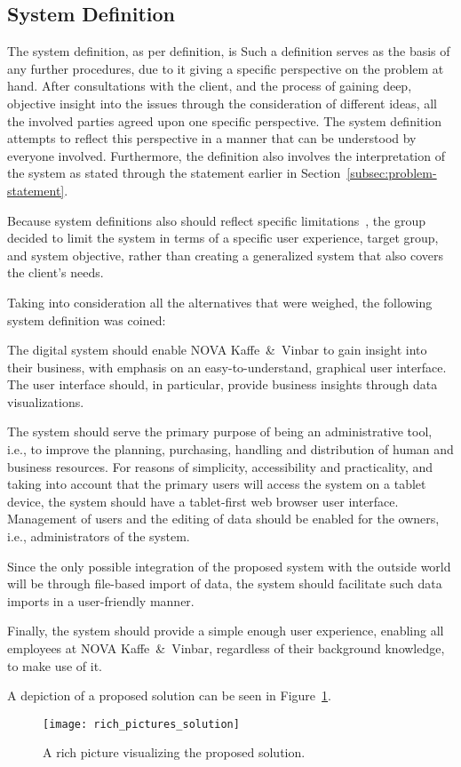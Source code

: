 \subsection{System Definition}\label{subsec:system-definition}

The system definition, as per definition, is
Such a definition serves as the basis of any further procedures, due to it giving a specific perspective on the problem
at hand.
After consultations with the client, and the process of gaining deep, objective insight into the issues through the
consideration of different ideas, all the involved parties agreed upon one specific perspective.
The system definition attempts to reflect this perspective in a manner that can be
understood by everyone involved.
Furthermore, the definition also involves the interpretation of the system as stated through the statement earlier in
Section~\ref{subsec:problem-statement}.

Because system definitions also should reflect specific limitations~\cite[38]{mathiassen2018}, the group decided to
limit the system in terms of a specific user experience, target group, and system objective, rather than creating a
generalized system that also covers the client's needs.

Taking into consideration all the alternatives that were weighed, the following system definition was coined:

\begin{tcolorbox}[title=System definition]
    The digital system should enable NOVA Kaffe~\&~Vinbar to gain insight into their business, with emphasis on an
    easy-to-understand, graphical user interface.
    The user interface should, in particular, provide business insights through data visualizations.

    The system should serve the primary purpose of being an administrative tool, i.e., to improve the planning,
    purchasing, handling and distribution of human and business resources.
    For reasons of simplicity, accessibility and practicality, and taking into account that the primary users will
    access the system on a tablet device, the system should have a tablet-first web browser user interface.
    Management of users and the editing of data should be enabled for the owners, i.e., administrators of the system.

    Since the only possible integration of the proposed system with the outside world will be through file-based import
    of data, the system should facilitate such data imports in a user-friendly manner.

    Finally, the system should provide a simple enough user experience, enabling all employees at NOVA Kaffe~\&~Vinbar,
    regardless of their background knowledge, to make use of it.
\end{tcolorbox}

A depiction of a proposed solution can be seen in Figure~\ref{fig:pda-solution}.

\begin{figure}[h]
    \centering
    \texttt{[image: rich\_pictures\_solution]}
    \caption{A rich picture visualizing the proposed solution.
    }\label{fig:pda-solution}
\end{figure}
